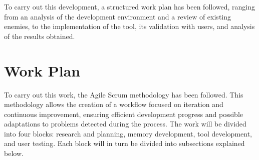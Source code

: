 To carry out this development, a structured work plan has been followed, ranging from an analysis of the development environment and a review of existing enemies, to the implementation of the tool, its validation with users, and analysis of the results obtained.\\


\section{Work Plan}
To carry out this work, the Agile Scrum methodology has been followed. This methodology allows the creation of a workflow focused on iteration and continuous improvement, ensuring efficient development progress and possible adaptations to problems detected during the process.
The work will be divided into four blocks: research and planning, memory development, tool development, and user testing.
Each block will in turn be divided into subsections explained below.
